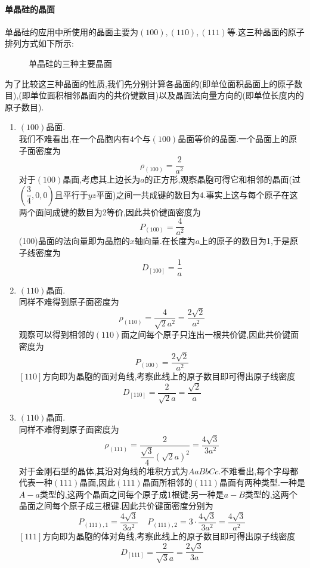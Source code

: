 \documentclass{ctexart}
\begin{document}
\paragraph{单晶硅的晶面}
单晶硅的应用中所使用的晶面主要为$(100),(110),(111)$等.这三种晶面的原子排列方式如下所示:
\begin{figure}[H]
    \centering
    \caption{单晶硅的三种主要晶面}
\end{figure}
为了比较这三种晶面的性质,我们先分别计算各晶面的(即单位面积晶面上的原子数目),(即单位面积相邻晶面内的共价键数目)以及晶面法向量方向的(即单位长度内的原子数目).
\begin{enumerate}[label=\tbf{\arabic*.},topsep=0pt,parsep=0pt,itemsep=0pt,partopsep=0pt]
    \item $(100)$晶面.\\
        我们不难看出,在一个晶胞内有$4$个与$(100)$晶面等价的晶面.一个晶面上的原子面密度为
        \[\rho_{(100)}=\dfrac{2}{a^2}\]
        对于$(100)$晶面,考虑其上边长为$a$的正方形,观察晶胞可得它和相邻的晶面(过$\left(\dfrac34,0,0\right)$且平行于$yz$平面)之间一共成键的数目为$4$.事实上这与每个原子在这两个面间成键的数目为2等价,因此共价键面密度为
        \[P_{(100)}=\dfrac{4}{a^2}\]
        (100)晶面的法向量即为晶胞的$x$轴向量.在长度为$a$上的原子的数目为1,于是原子线密度为
        \[D_{[100]}=\dfrac{1}{a}\]
    \item $(110)$晶面.\\
        同样不难得到原子面密度为
        \[\rho_{(110)}=\dfrac{4}{\sqrt2a^2}=\dfrac{2\sqrt2}{a^2}\]
        观察可以得到相邻的$(110)$面之间每个原子只连出一根共价键,因此共价键面密度为
        \[P_{(100)}=\dfrac{2\sqrt2}{a^2}\]
        $[110]$方向即为晶胞的面对角线,考察此线上的原子数目即可得出原子线密度
        \[D_{[110]}=\dfrac{2}{\sqrt2a}=\dfrac{\sqrt2}{a}\]
    \item $(110)$晶面.\\
        同样不难得到原子面密度为
        \[\rho_{(111)}=\dfrac{2}{\dfrac{\sqrt3}{4}\left(\sqrt2a\right)^2}=\dfrac{4\sqrt3}{3a^2}\]
        对于金刚石型的晶体,其沿对角线的堆积方式为$AaBbCc$.不难看出,每个字母都代表一种$(111)$晶面,因此$(111)$晶面所相邻的$(111)$晶面有两种类型.一种是$A-a$类型的,这两个晶面之间每个原子成1根键;另一种是$a-B$类型的,这两个晶面之间每个原子成三根键.因此共价键面密度分别为
        \[P_{(111),1}=\dfrac{4\sqrt3}{3a^2}\ \ \ \ \ P_{(111),2}=3\cdot\dfrac{4\sqrt3}{3a^2}=\dfrac{4\sqrt3}{a^2}\]
        $[111]$方向即为晶胞的体对角线,考察此线上的原子数目即可得出原子线密度
        \[D_{[111]}=\dfrac{2}{\sqrt3a}=\dfrac{2\sqrt3}{3a}\]
\end{enumerate}
\end{document}
